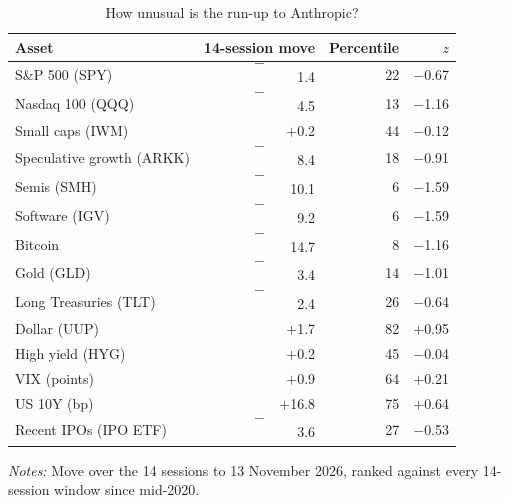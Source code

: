\begin{table}[!htbp]\centering\footnotesize
\caption{How unusual is the run-up to Anthropic?}\label{tab:runup}

\begin{threeparttable}
\begin{tabular}{lrrr}
\toprule
Asset & 14-session move & Percentile & $z$ \\
\midrule
S\&P 500 (SPY) & $$-$$1.4 & 22 & $-$0.67 \\
Nasdaq 100 (QQQ) & $$-$$4.5 & 13 & $-$1.16 \\
Small caps (IWM) & $+$0.2 & 44 & $-$0.12 \\
Speculative growth (ARKK) & $$-$$8.4 & 18 & $-$0.91 \\
Semis (SMH) & $$-$$10.1 & 6 & $-$1.59 \\
Software (IGV) & $$-$$9.2 & 6 & $-$1.59 \\
Bitcoin & $$-$$14.7 & 8 & $-$1.16 \\
Gold (GLD) & $$-$$3.4 & 14 & $-$1.01 \\
Long Treasuries (TLT) & $$-$$2.4 & 26 & $-$0.64 \\
Dollar (UUP) & $+$1.7 & 82 & $+$0.95 \\
High yield (HYG) & $+$0.2 & 45 & $-$0.04 \\
VIX (points) & $+$0.9 & 64 & $+$0.21 \\
US 10Y (bp) & $+$16.8 & 75 & $+$0.64 \\
Recent IPOs (IPO ETF) & $$-$$3.6 & 27 & $-$0.53 \\
\bottomrule
\end{tabular}
\begin{tablenotes}[flushleft]\footnotesize
\item \textit{Notes:} Move over the 14 sessions to 13 November 2026, ranked against every 14-session window since mid-2020.
\end{tablenotes}
\end{threeparttable}

\end{table}
